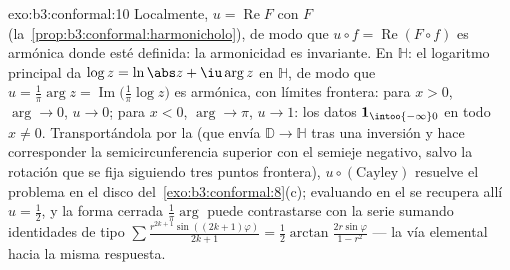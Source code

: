 \begin{solution}{exo:b3:conformal:10}
Localmente, $u = \operatorname{Re}F$ con $F$
(la~\cref{prop:b3:conformal:harmonicholo}), de modo que $u\circ f =
\operatorname{Re}(F\circ f)$ es armónica donde esté definida: la
armonicidad es 
invariante. En $\mathbb H$: el logaritmo principal da
$\log z = \ln\abs z + \iu\arg z$
 en $\mathbb H$, de modo que
$u = \frac1\pi\arg z =
\operatorname{Im}\bigl(\frac1\pi\log z\bigr)$ es armónica, con límites
frontera: para $x > 0$, $\arg \to 0$, $u \to 0$; para $x < 0$,
$\arg \to \pi$, $u \to 1$: los datos $\mathbf
1_{\intoo{-\infty}0}$ en todo $x \neq 0$. Transportándola por la
 (que envía
$\mathbb D \to \mathbb H$ tras una inversión y hace corresponder la
semicircunferencia superior con el semieje negativo, salvo la rotación
que se fija siguiendo tres puntos frontera), $u\circ(\text{Cayley})$
resuelve el problema en el disco del~\cref{exo:b3:conformal:8}(c);
evaluando en el  se recupera allí
$u = \frac12$, y la forma cerrada $\frac1\pi\arg$ puede contrastarse con
la serie sumando identidades de tipo
$\sum\frac{r^{2k+1}\sin((2k+1)\varphi)}{2k+1} =
\frac12\arctan\frac{2r\sin\varphi}{1 - r^2}$ --- la vía elemental hacia
la misma respuesta.
\end{solution}

